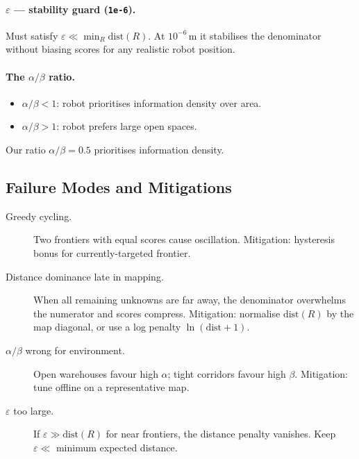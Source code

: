 \documentclass[12pt,a4paper]{article}
\begin{document}
\paragraph{$\varepsilon$ --- stability guard (\texttt{1e-6}).}
Must satisfy $\varepsilon \ll \min_R \text{dist}(R)$.
At $10^{-6}$\,m it stabilises the denominator without biasing scores for
any realistic robot position.

\paragraph{The $\alpha/\beta$ ratio.}
\begin{itemize}
  \item $\alpha/\beta < 1$: robot prioritises information density over area.
  \item $\alpha/\beta > 1$: robot prefers large open spaces.
\end{itemize}
Our ratio $\alpha/\beta = 0.5$ prioritises information density.

\subsection{Failure Modes and Mitigations}

\begin{description}
  \item[Greedy cycling.]
        Two frontiers with equal scores cause oscillation.
        Mitigation: hysteresis bonus for currently-targeted frontier.

  \item[Distance dominance late in mapping.]
        When all remaining unknowns are far away, the denominator overwhelms
        the numerator and scores compress.
        Mitigation: normalise $\text{dist}(R)$ by the map diagonal,
        or use a log penalty $\ln(\text{dist}+1)$.

  \item[$\alpha/\beta$ wrong for environment.]
        Open warehouses favour high $\alpha$; tight corridors favour high $\beta$.
        Mitigation: tune offline on a representative map.

  \item[$\varepsilon$ too large.]
        If $\varepsilon \gg \text{dist}(R)$ for near frontiers,
        the distance penalty vanishes.
        Keep $\varepsilon \ll$ minimum expected distance.
\end{description}
\end{document}
